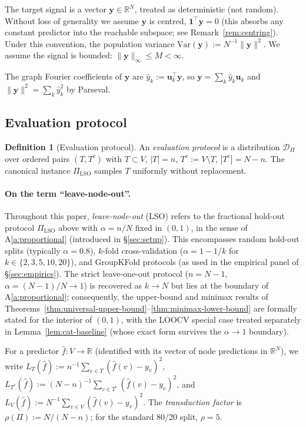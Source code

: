 \documentclass[11pt,a4paper]{article}
\theoremstyle{plain}
\theoremstyle{definition}
\newtheorem{definition}[theorem]{Definition}
\theoremstyle{remark}
\newcommand{\by}{\mathbf{y}}
\newcommand{\bu}{\mathbf{u}}
\newcommand{\bone}{\mathbf{1}}
\newcommand{\R}{\mathbb{R}}
\newcommand{\Var}{\mathrm{Var}}
\newcommand{\Dcal}{\mathcal{D}}
\begin{document}
The target signal is a vector $\by \in \R^N$, treated as deterministic
(not random).  Without loss of generality we assume $\by$ is centred,
$\bone^\top \by = 0$ (this absorbs any constant predictor into the
reachable subspace; see Remark~\ref{rem:centring}).  Under this
convention, the population variance
$\Var(\by) := N^{-1} \|\by\|^2$.
We assume the signal is bounded: $\|\by\|_\infty \leq M < \infty$.

The graph Fourier coefficients of $\by$ are $\hat y_k := \bu_k^\top \by$,
so $\by = \sum_k \hat y_k \bu_k$ and $\|\by\|^2 = \sum_k \hat y_k^2$
by Parseval.

\subsection{Evaluation protocol}
\label{subsec:setup-protocol}

\begin{definition}[Evaluation protocol]
\label{def:protocol}
An \emph{evaluation protocol} is a distribution $\Dcal_\Pi$ over
ordered pairs $(T, T^c)$ with $T \subset V$, $|T| = n$,
$T^c := V \setminus T$, $|T^c| = N - n$.  The canonical instance
$\Pi_{\mathrm{LSO}}$ samples $T$ uniformly without replacement.
\end{definition}

\paragraph{On the term ``leave-node-out''.} Throughout this paper,
\emph{leave-node-out} (LSO) refers to the fractional hold-out
protocol $\Pi_{\mathrm{LSO}}$ above with $\alpha = n/N$ fixed in
$(0, 1)$, in the sense of A\ref{a:proportional} (introduced in
\S\ref{sec:setup}). This encompasses random hold-out splits
(typically $\alpha = 0.8$), $k$-fold cross-validation
($\alpha = 1 - 1/k$ for $k \in \{2, 3, 5, 10, 20\}$), and
GroupKFold protocols (as used in the empirical panel of
\S\ref{sec:empirics}). The strict leave-one-out protocol ($n = N -
1$, $\alpha = (N-1)/N \to 1$) is recovered as $k \to N$ but lies
at the boundary of A\ref{a:proportional}; consequently, the
upper-bound and minimax results of
Theorems~\ref{thm:universal-upper-bound}--\ref{thm:minimax-lower-bound}
are formally stated for the interior of $(0, 1)$, with the
LOOCV special case treated separately in
Lemma~\ref{lem:cat-baseline} (whose exact form survives the
$\alpha \to 1$ boundary).

For a predictor $\hat f : V \to \R$ (identified with its vector of
node predictions in $\R^N$), we write
$L_T(\hat f) := n^{-1} \sum_{v \in T} (\hat f(v) - y_v)^2$,
$L_{T^c}(\hat f) := (N-n)^{-1} \sum_{v \in T^c} (\hat f(v) - y_v)^2$,
and $L_V(\hat f) := N^{-1} \sum_{v \in V} (\hat f(v) - y_v)^2$.
The \emph{transduction factor} is $\rho(\Pi) := N/(N-n)$; for the
standard 80/20 split, $\rho = 5$.
\end{document}
